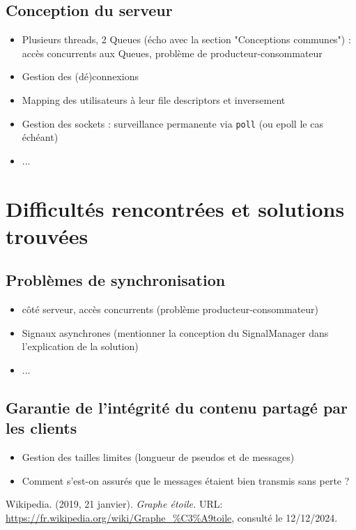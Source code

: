 \documentclass{article}
\begin{document}
\subsection{Conception du serveur}
\begin{itemize}
    \item Plusieurs threads, 2 Queues (écho avec la section "Conceptions communes") : accès concurrents aux Queues, problème de producteur-consommateur
    \item Gestion des (dé)connexions
    \item Mapping des utilisateurs à leur file descriptors et inversement
    \item Gestion des sockets : surveillance permanente via \texttt{poll} (ou epoll le cas échéant)
    \item ...

\end{itemize}

\section{Difficultés rencontrées et solutions trouvées}
\subsection{Problèmes de synchronisation}
\begin{itemize}
    \item côté serveur, accès concurrents (problème producteur-consommateur)
    \item Signaux asynchrones (mentionner la conception du SignalManager dans l'explication de la solution)
    \item ...
\end{itemize}

\subsection{Garantie de l'intégrité du contenu partagé par les clients}
\begin{itemize}
    \item Gestion des tailles limites (longueur de pseudos et de messages)
    \item Comment s'est-on assurés que le messages étaient bien transmis sans perte ?
\end{itemize}


\begin{thebibliography}{999}
		Wikipedia. (2019, 21 janvier). \textit{Graphe étoile.} URL: \url{https://fr.wikipedia.org/wiki/Graphe_%C3%A9toile}, consulté le 12/12/2024.
\end{thebibliography}
\end{document}
